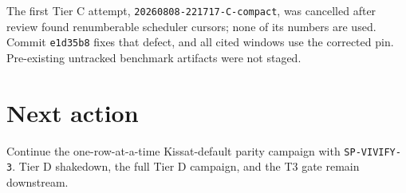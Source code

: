 \documentclass[11pt]{article}
\begin{document}
The first Tier C attempt, \texttt{20260808-221717-C-compact}, was cancelled
after review found renumberable scheduler cursors; none of its numbers are used.
Commit \texttt{e1d35b8} fixes that defect, and all cited windows use the corrected
pin.  Pre-existing untracked benchmark artifacts were not staged.

\section{Next action}
Continue the one-row-at-a-time Kissat-default parity campaign with
\texttt{SP-VIVIFY-3}.  Tier D shakedown, the full Tier D campaign, and the T3
gate remain downstream.
\end{document}
